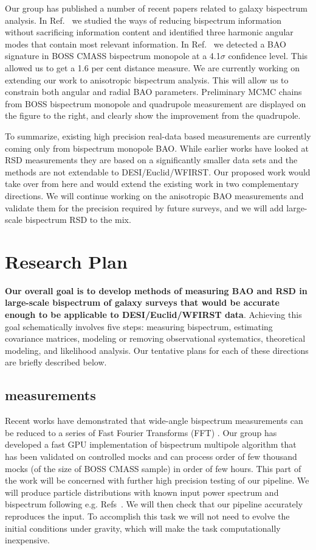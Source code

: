 Our group has published a number of recent papers related to galaxy bispectrum
analysis. In Ref.~\cite{2017MNRAS.467..928G} we studied the ways of reducing
bispectrum information without sacrificing information content and identified
three harmonic angular modes that contain most relevant information. In
Ref.~\cite{2018MNRAS.478.4500P} we detected a BAO signature in BOSS CMASS
bispectrum monopole at a 4.1$\sigma$ confidence level. This allowed us to
get a 1.6 per cent distance measure. We are currently working on extending our
work to anisotropic bispectrum analysis. This will allow us to constrain both
angular and radial BAO parameters. Preliminary MCMC chains from BOSS bispectrum
monopole and quadrupole measurement are displayed on the figure to the right,
and clearly show the improvement from the quadrupole.

To summarize, existing high precision real-data based measurements are
currently coming only from bispectrum monopole BAO. While earlier works have
looked at RSD measurements they are based on a significantly smaller data sets
and the methods are not extendable to DESI/Euclid/WFIRST. Our proposed work
would take over from here and would extend the existing work in two
complementary directions. We will continue working on the anisotropic BAO
measurements and validate them for the precision required by future surveys,
and we will add large-scale bispectrum RSD to the mix.

\section{Research Plan}

\textbf{Our overall goal is to develop methods of measuring BAO and RSD in
large-scale bispectrum of galaxy surveys that would be accurate enough to be
applicable to DESI/Euclid/WFIRST data}. Achieving this goal schematically
involves five steps: measuring bispectrum, estimating covariance matrices,
modeling or removing observational systematics, theoretical modeling, and
likelihood analysis. Our tentative plans for each of these directions are
briefly described below.

\subsection*{measurements}

Recent works have demonstrated that wide-angle bispectrum measurements can
be reduced to a series of Fast Fourier Transforms (FFT)
\cite{2015PhRvD..92h3532S,2018arXiv180302132S}. Our group has developed a fast
GPU implementation of bispectrum multipole algorithm that has been validated on
controlled mocks and can process order of few thousand mocks (of the size of
BOSS CMASS sample) in order of few hours. This part of the work will be
concerned with further high precision testing of our pipeline. We will produce
particle distributions with known input power spectrum and bispectrum following
e.g. Refs~\cite{2012PhRvD..85h3002S,2012PhRvD..86l3524R,2010JCAP...10..022W}.
We will then check that our pipeline accurately reproduces the input. To
accomplish this task we will not need to evolve the initial conditions under
gravity, which will make the task computationally inexpensive. 

